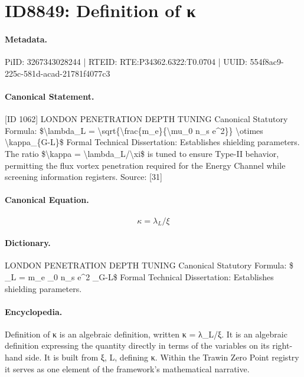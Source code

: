 \section*{ID8849: Definition of κ}
\paragraph{Metadata.}
PiID: 3267343028244 | RTEID: RTE:P34362.6322:T0.0704 | UUID: 554f8ac9-225c-581d-acad-21781f4077c3

\paragraph{Canonical Statement.}
[ID 1062] LONDON PENETRATION DEPTH TUNING Canonical Statutory Formula: \$\textbackslash{}lambda\_L = \textbackslash{}sqrt\{\textbackslash{}frac\{m\_e\}\{\textbackslash{}mu\_0 n\_s e\textasciicircum{}2\}\} \textbackslash{}otimes \textbackslash{}kappa\_\{G-L\}\$ Formal Technical Dissertation: Establishes shielding parameters. The ratio \$\textbackslash{}kappa = \textbackslash{}lambda\_L/\textbackslash{}xi\$ is tuned to ensure Type-II behavior, permitting the flux vortex penetration required for the Energy Channel while screening information registers. Source: [31]

\paragraph{Canonical Equation.}
\[
\kappa = \lambda_L/\xi
\]

\paragraph{Dictionary.}
LONDON PENETRATION DEPTH TUNING Canonical Statutory Formula: \$ \_L = m\_e \_0 n\_s e\textasciicircum{}2 \_G-L\$ Formal Technical Dissertation: Establishes shielding parameters.

\paragraph{Encyclopedia.}
Definition of κ is an algebraic definition, written κ = λ\_L/ξ. It is an algebraic definition expressing the quantity directly in terms of the variables on its right-hand side. It is built from ξ, L, defining κ. Within the Trawin Zero Point registry it serves as one element of the framework's mathematical narrative.
